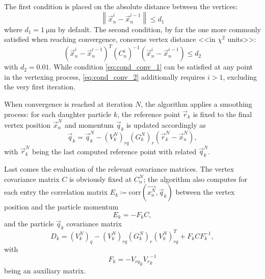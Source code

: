 The first condition is placed on the absolute distance between the vertices:
\begin{equation}
	\left\|
	\vec{x}_n^{i} - \vec{x}_n^{i-1}
	\right\| \leq d_1
	\label{eq:cond_conv_1}
\end{equation}
where $d_1 = \SI{1}{\micro\meter}$ by default.
The second condition, by far the one more commonly satisfied when reaching convergence, concerns vertex distance <<in $\chi^2$ units>>:
\begin{equation}
	{\left(
	\vec{x}_n^{i} - \vec{x}_n^{i-1}
	\right)}^T
	{(C_n^i)}^{-1}
	\left(
	\vec{x}_n^{i} - \vec{x}_n^{i-1}
	\right)
	\leq d_2
	\label{eq:cond_conv_2}
\end{equation}
with $d_2 = 0.01$.
While condition \eqref{eq:cond_conv_1} can be satisfied at any point in the vertexing process, \eqref{eq:cond_conv_2} additionally requires $i>1$, excluding the very first iteration.

When convergence is reached at iteration $N$, the algorithm applies a smoothing process: for each daughter particle $k$, the reference point $\vec{r}_k$ is fixed to the final vertex position $\vec{x}_n^{N}$ and momentum $\vec{q}_k$ is updated accordingly as
\begin{equation}
	\vec{q}_k =
	\vec{q}_k^N
	-
	{(V_k^N)}_{rq}
	{(G_k^N)}_{r}
	\left(
		\vec{r}_k^N - \vec{x}_n^N
	\right),
\end{equation}
with $\vec{r}_k^N$ being the last computed reference point with related $\vec{q}_k^N$.

Last comes the evaluation of the relevant covariance matrices. The vertex covariance matrix $C$ is obviously fixed at $C_n^N$;
the algorithm also computes for each entry the correlation matrix $E_k \coloneqq \text{corr}\left(\vec{x_n^N},\vec{q}_k\right)$ between the vertex position and the particle momentum
\begin{equation}
	E_k = - F_k C,
	\label{eq:Ek}
\end{equation}
and the particle $\vec{q}_k$ covariance matrix
\begin{equation}
	D_k =
	{(V_k^N)}_q
	-
	{(V_k^N)}_{rq}
	{(G_k^N)}_r
	{(V_k^N)}_{rq}^T
	+
	F_k C F_k^{-1},
	\label{eq:Dk}
\end{equation}
with
\begin{equation}
	F_k =
	- {V_{rq}}_k {V_r}_k^{-1}
	\label{eq:Fk}
\end{equation}
being an auxiliary matrix.

